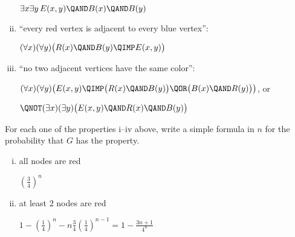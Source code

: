 \begin{problem}
\begin{enumerate}[(i)]
\begin{solution}
$\exists x\exists y\, 
	E(x,y) \QAND 
	B(x) \QAND B(y)$
\end{solution}
\examspace[0.75in]

\item ``every red vertex is adjacent to every blue vertex'': 

\begin{solution}
$(\forall x)(\forall y)\bigl( 
	R(x) \QAND B(y)
	\QIMP
	E(x,y)
\bigr)$
\end{solution}

\examspace[0.75in]

\item  \label{item-difficult} ``no two adjacent vertices have the same color'': 

\begin{solution}
$(\forall x)(\forall y)\bigl( 
	E(x,y) 
	\QIMP
	\bigl( R(x) \QAND B(y) \bigr)
	\QOR
	\bigl( B(x) \QAND R(y) \bigr)
\bigr)$, or

$\QNOT (\exists x)(\exists y)\bigl(
	E(x,y) \QAND
	R(x) \QAND B(y) 
\bigr)$
\end{solution}

\examspace[0.75in]

\end{enumerate}


\ppart For each one of the properties i--iv above, write a simple
formula in $n$ for the probability that $G$ has the property.

\begin{enumerate}[(i)]

\item all nodes are red
\begin{solution}
\brule{0.5in}	$(\tfrac{3}{4})^n$
\end{solution}
 
%

%

\item at least 2 nodes are red
\begin{solution}
 	$1 - (\tfrac{1}{4})^n - n\tfrac{3}{4}(\tfrac{1}{4})^{n-1}
	=
	1 - \tfrac{3n+1}{4^n}$
\end{solution}\brule{0.5in}


\end{enumerate}
\end{problem}

